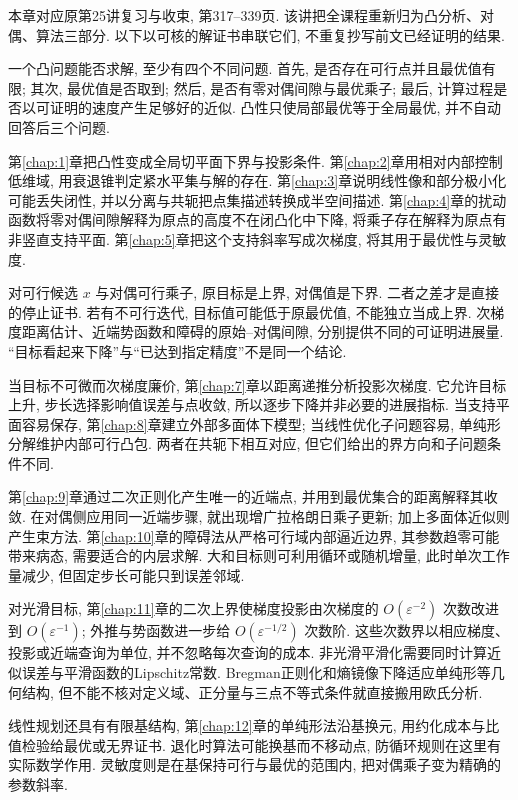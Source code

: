 \label{chap:13}
本章对应原第25讲复习与收束, 第317--339页. 该讲把全课程重新归为凸分析、对偶、算法三部分. 以下以可核的解证书串联它们, 不重复抄写前文已经证明的结果.

一个凸问题能否求解, 至少有四个不同问题. 首先, 是否存在可行点并且最优值有限; 其次, 最优值是否取到; 然后, 是否有零对偶间隙与最优乘子; 最后, 计算过程是否以可证明的速度产生足够好的近似. 凸性只使局部最优等于全局最优, 并不自动回答后三个问题.

第\ref{chap:1}章把凸性变成全局切平面下界与投影条件. 第\ref{chap:2}章用相对内部控制低维域, 用衰退锥判定紧水平集与解的存在. 第\ref{chap:3}章说明线性像和部分极小化可能丢失闭性, 并以分离与共轭把点集描述转换成半空间描述. 第\ref{chap:4}章的扰动函数将零对偶间隙解释为原点的高度不在闭凸化中下降, 将乘子存在解释为原点有非竖直支持平面. 第\ref{chap:5}章把这个支持斜率写成次梯度, 将其用于最优性与灵敏度.

对可行候选 $x$ 与对偶可行乘子, 原目标是上界, 对偶值是下界. 二者之差才是直接的停止证书. 若有不可行迭代, 目标值可能低于原最优值, 不能独立当成上界. 次梯度距离估计、近端势函数和障碍的原始--对偶间隙, 分别提供不同的可证明进展量. “目标看起来下降”与“已达到指定精度”不是同一个结论.

当目标不可微而次梯度廉价, 第\ref{chap:7}章以距离递推分析投影次梯度. 它允许目标上升, 步长选择影响值误差与点收敛, 所以逐步下降并非必要的进展指标. 当支持平面容易保存, 第\ref{chap:8}章建立外部多面体下模型; 当线性优化子问题容易, 单纯形分解维护内部可行凸包. 两者在共轭下相互对应, 但它们给出的界方向和子问题条件不同.

第\ref{chap:9}章通过二次正则化产生唯一的近端点, 并用到最优集合的距离解释其收敛. 在对偶侧应用同一近端步骤, 就出现增广拉格朗日乘子更新; 加上多面体近似则产生束方法. 第\ref{chap:10}章的障碍法从严格可行域内部逼近边界, 其参数趋零可能带来病态, 需要适合的内层求解. 大和目标则可利用循环或随机增量, 此时单次工作量减少, 但固定步长可能只到误差邻域.

对光滑目标, 第\ref{chap:11}章的二次上界使梯度投影由次梯度的 $O(\varepsilon^{-2})$ 次数改进到 $O(\varepsilon^{-1})$; 外推与势函数进一步给 $O(\varepsilon^{-1/2})$ 次数阶. 这些次数界以相应梯度、投影或近端查询为单位, 并不忽略每次查询的成本. 非光滑平滑化需要同时计算近似误差与平滑函数的Lipschitz常数. Bregman正则化和熵镜像下降适应单纯形等几何结构, 但不能不核对定义域、正分量与三点不等式条件就直接搬用欧氏分析.

线性规划还具有有限基结构, 第\ref{chap:12}章的单纯形法沿基换元, 用约化成本与比值检验给最优或无界证书. 退化时算法可能换基而不移动点, 防循环规则在这里有实际数学作用. 灵敏度则是在基保持可行与最优的范围内, 把对偶乘子变为精确的参数斜率.

